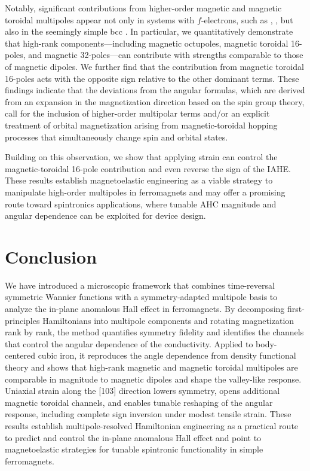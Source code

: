 \documentclass[preprint,12pt]{elsarticle}
\begin{document}
Notably, significant contributions from higher-order magnetic and
magnetic toroidal multipoles appear not only in systems with $f$-electrons,
such as  \cite{Mentink1994-vc, Oyamada2007-nb,
Saito2018-hc, Ishitobi2023-fj},
 \cite{Motoyama2018-fo, Shinozaki2020-eu,
Shinozaki2020-yj,Hayami2022-ci}
, but also in the seemingly simple bcc .
In particular, we quantitatively demonstrate that high-rank
components—including magnetic octupoles, magnetic toroidal 16-poles,
and magnetic 32-poles—can contribute with strengths comparable to
those of magnetic dipoles.
We further find that the contribution
from magnetic toroidal 16-poles acts with the opposite sign relative
to the other dominant terms.
These findings indicate that the deviations from the angular
formulas, which are derived from an expansion in the magnetization
direction based on the spin group theory, call for the inclusion of
higher-order multipolar terms and/or an explicit treatment of orbital
magnetization arising from magnetic-toroidal hopping processes that
simultaneously change spin and orbital states.

Building on this observation, we show that applying strain can
control the magnetic-toroidal 16-pole contribution and even reverse
the sign of the IAHE. These results establish magnetoelastic
engineering as a viable strategy to manipulate high-order multipoles
in ferromagnets and may offer a promising route toward spintronics applications,
where tunable AHC magnitude and angular dependence can be exploited
for device design.
 \section{Conclusion}
We have introduced a microscopic framework that combines time-reversal
symmetric Wannier functions with a symmetry-adapted multipole basis
to analyze the in-plane anomalous Hall effect in ferromagnets. By
decomposing first-principles Hamiltonians into multipole components
and rotating magnetization rank by rank, the method quantifies
symmetry fidelity and identifies the channels that control the
angular dependence of the conductivity. Applied to body-centered
cubic iron, it reproduces the angle dependence from density
functional theory and shows that high-rank magnetic and magnetic
toroidal multipoles are comparable in magnitude to magnetic dipoles
and shape the valley-like response. Uniaxial strain along the [103] direction
lowers symmetry, opens additional magnetic toroidal channels, and
enables tunable reshaping of the angular response, including complete
sign inversion under modest tensile strain. These results
establish multipole-resolved Hamiltonian engineering as a practical
route to predict and control the in-plane anomalous Hall effect and
point to magnetoelastic strategies for tunable spintronic
functionality in simple ferromagnets.
 
\end{document}
